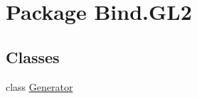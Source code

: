 \hypertarget{namespace_bind_1_1_g_l2}{
\section{Package Bind.GL2}
\label{namespace_bind_1_1_g_l2}
}
\subsection*{Classes}
\begin{DoxyCompactItemize}
\item 
class \hyperlink{class_bind_1_1_g_l2_1_1_generator}{Generator}
\end{DoxyCompactItemize}
